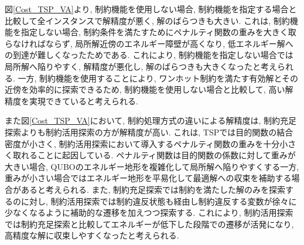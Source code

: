 \documentclass[submit,techrep,noauthor]{ipsj}
\begin{document}
図\ref{Cost_TSP_VA}より, 制約機能を使用しない場合, 制約機能を指定する場合と比較して全インスタンスで解精度が悪く, 解のばらつきも大きい. これは, 制約機能を指定しない場合, 制約条件を満たすためにペナルティ関数の重みを大きく取らなければならず, 局所解近傍のエネルギー障壁が高くなり, 低エネルギー解への到達が難しくなったためである. これにより, 制約機能を指定しない場合では局所解へ陥りやすく, 解精度が悪化し, 解のばらつきも大きくなったと考えられる.
一方, 制約機能を使用することにより, ワンホット制約を満たす有効解とその近傍を効率的に探索できるため, 制約機能を使用しない場合と比較して, 高い解精度を実現できていると考えられる.

また図\ref{Cost_TSP_VA}において, 制約処理方式の違いによる解精度は, 制約充足探索よりも制約活用探索の方が解精度が高い. これは, TSPでは目的関数の結合密度が小さく, 制約活用探索において導入するペナルティ関数の重みを十分小さく取れることに起因している. ペナルティ関数は目的関数の係数に対して重みが大きい場合, QUBOのエネルギー地形を複雑化して局所解へ陥りやすくする一方, 重みが小さい場合ではエネルギー地形を平易化して最適解への収束を補助する場合があると考えられる. また, 制約充足探索では制約を満たした解のみを探索するのに対し, 制約活用探索では制約違反状態も経由し制約違反する変数が徐々に少なくなるように補助的な遷移を加えつつ探索する. これにより, 制約活用探索では制約充足探索と比較してエネルギーが低下した段階での遷移が活発になり, 高精度な解に収束しやすくなったと考えられる.

\end{document}
